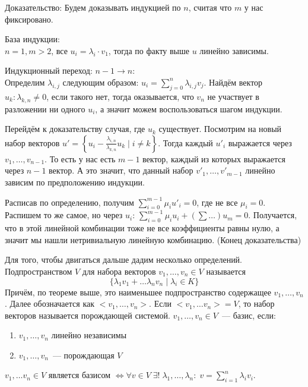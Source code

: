 Доказательство:
Будем доказывать индукцией по $n$, считая что $m$ у нас фиксировано.

База индукции:\\$n = 1, m > 2$, все $u_i = \lambda_i\cdot v_1$, тогда по факту выше $u$ линейно зависимы.

Индукционный переход: $n - 1\rightarrow n$:\\
Определим $\lambda_{i,j}$ следующим образом: $u_i = \sum_{j=0}^{n} \lambda_{i,j} v_j$.
Найдём вектор $u_k: \lambda_{k,n}\not=0$, если такого нет, тогда оказывается, что $v_n$ не
участвует в разложении ни одного $u_i$, а значит можем воспользоваться шагом индукции.

Перейдём к доказательству случая, где $u_k$ существует.
Посмотрим на новый набор векторов $u' = \left\{u_i - \frac{\lambda_{i,n}}{\lambda_{k,n}}u_k \mid i\not=k\right\}$.
Тогда каждый $u'_i$ выражается через $v_1,\dots,v_{n-1}$.
То есть у нас есть $m-1$ вектор, каждый из которых выражается
через $n-1$ вектор. А это значит, что данный набор $v'_1,\dots, v'_{m-1}$ линейно зависим по предположению индукции.

Расписав по определению, получим $\sum_{i=0}^{m-1}\mu_i u'_i = 0$, где не все $\mu_i=0$.
Распишем то же самое, но через $u_i$: $\sum_{i=0}^{m-1}\mu_iu_i + (\sum\dots)u_m=0$. Получается, что в этой
линейной комбинации тоже не все коэффициенты равны нулю, а значит мы нашли нетривиальную
линейную комбинацию. (Конец доказательства)
\bigskip

Для того, чтобы двигаться дальше дадим несколько определений.
 Подпространством $V$ для набора векторов $v_1, \dots, v_n\in V$ называется
$$\{\lambda_1v_1 + \dots \lambda_nv_n \mid \lambda_i\in K\}$$
Причём, по теореме выше, это наименьшее подпространство содержащее $v_1,\dots,v_n$.
Далее обозначается как $<v_1,\dots, v_n>$.
 Если $<v_1,\dots v_n> = V$, то набор векторов называется
порождающей системой.
 $v_1, \dots, v_n\in V$~--- базис, если:
\begin{enumerate}
    \item $v_1,\dots,v_n$ линейно независимы
    \item $v_1,\dots, v_n$~--- порождающая $V$
\end{enumerate}

\utvr
$v_1,\dots v_n \in V$ является базисом $\Leftrightarrow \forall v\in V\; \exists !\;
\lambda_1,\dots,\lambda_n:\; v = \sum_{i=1}^{n}\lambda_iv_i$.

